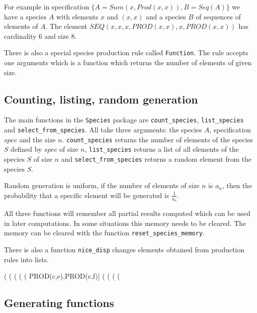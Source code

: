 \documentclass[11pt]{article}
\newcommand{\command}[1]{\texttt{#1}}
\begin{document}
For example in specification $\{A=Sum(x, Prod(x,x)), B=Seq(A)\}$ we
have a species $A$ with elements $x$ and $(x,x)$ and a species $B$ of
sequences of elements of $A$. The element $SEQ(x, x, x, PROD(x,x), x,
PROD(x,x))$ has cardinality 6 and size 8.

There is also a special species production rule called \command{Function}.
The rule accepts one arguments which is a function which returns the
number of elements of given size.

\subsection{Counting, listing, random generation}

The main functions in the \command{Species} package are
\command{count\_species}, \command{list\_species} and
\command{select\_from\_species}. All take three arguments: the species
$A$, specification $spec$ and the size $n$.  \command{count\_species}
returns the number of elements of the species $S$ defined by $spec$ of
size $n$, \command{list\_species} returns a list of all elements of
the species $S$ of size $n$ and \command{select\_from\_species}
returns a random element from the species $S$.

Random generation is uniform, if the number of elements of size $n$ is
$a_n$, then the probability that a specific element will be generated
is $\frac{1}{a_n}$.

All three functions will remember all partial results computed which
can be used in later computations. In some situations this memory
needs to be cleared. The memory can be cleared with the function
\command{reset\_species\_memory}.

There is also a function \command{nice\_disp} changes elements
obtained from production rules into lists.

\begin{example}
(%
(%
(%
(%
(%
       PROD(c,e),PROD(c,f)]
(%
(%
(%
(%
\end{example}

\subsection{Generating functions}
\end{document}
